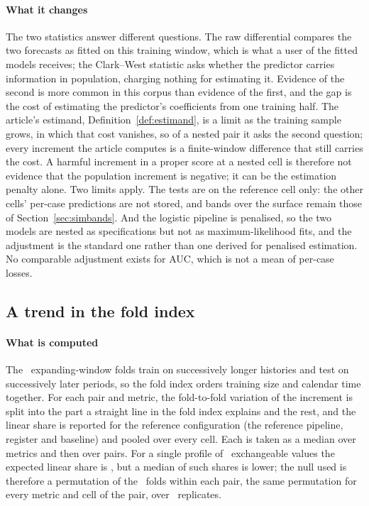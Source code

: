 \paragraph{What it changes}
The two statistics answer different questions. The raw differential compares
the two forecasts as fitted on this training window, which is what a user of
the fitted models receives; the Clark--West statistic asks whether the
predictor carries information in population, charging nothing for estimating
it. Evidence of the second is more common in this corpus than evidence of the
first, and the gap is the cost of estimating the predictor's coefficients from
one training half. The article's estimand, Definition~\ref{def:estimand}, is a
limit as the training sample grows, in which that cost vanishes, so of a
nested pair it asks the second question; every increment the article
computes is a finite-window difference that still carries the cost. A harmful
increment in a proper score at a nested cell is therefore not evidence that
the population increment is negative; it can be the estimation penalty alone.
Two limits apply. The
tests are on the reference cell only: the other cells' per-case predictions
are not stored, and bands over the surface remain those of
Section~\ref{sec:simbands}. And the logistic pipeline is penalised, so the two
models are nested as specifications but not as maximum-likelihood fits, and
the adjustment is the standard one rather than one derived for penalised
estimation. No comparable adjustment exists for AUC, which is not a mean of
per-case losses.

\subsection{A trend in the fold index}
\label{app:ijf-foldtrend}

\paragraph{What is computed}
The \nFolds\ expanding-window folds train on successively longer histories and
test on successively later periods, so the fold index orders training size and
calendar time together. For each pair and metric, the fold-to-fold variation
of the increment is split into the part a straight line in the fold index
explains and the rest, and the linear share is reported for the reference
configuration (the reference pipeline, register and baseline) and pooled over
every cell. Each is taken as a median over metrics and then over pairs. For a
single profile of \nFolds\ exchangeable values the expected linear share is
\foldTrendExpected, but a median of such shares is lower; the null used is
therefore a permutation of the \nFolds\ folds within each pair, the same
permutation for every metric and cell of the pair, over \nFoldTrendPerm\
replicates.

